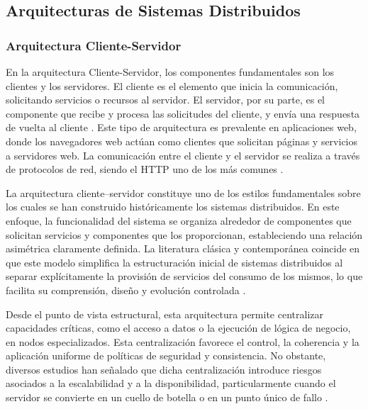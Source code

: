 			\subsection{Arquitecturas de Sistemas Distribuidos}
			\noindent
			
				\subsubsection{Arquitectura Cliente-Servidor}
				\noindent
					En la arquitectura Cliente-Servidor, los componentes fundamentales son los clientes y los servidores. El cliente es el elemento que inicia la comunicación, solicitando servicios o recursos al servidor. El servidor, por su parte, es el componente que recibe y procesa las solicitudes del cliente, y envía una respuesta de vuelta al cliente \cite{Francisco2021}. Este tipo de arquitectura es prevalente en aplicaciones web, donde los navegadores web actúan como clientes que solicitan páginas y servicios a servidores web. La comunicación entre el cliente y el servidor se realiza a través de protocolos de red, siendo el HTTP uno de los más comunes \cite{Colaso2019accuracy,Francisco2021}.
					
					La arquitectura cliente–servidor constituye uno de los estilos fundamentales sobre los cuales se han construido históricamente los sistemas distribuidos. En este enfoque, la funcionalidad del sistema se organiza alrededor de componentes que solicitan servicios y componentes que los proporcionan, estableciendo una relación asimétrica claramente definida. La literatura clásica y contemporánea coincide en que este modelo simplifica la estructuración inicial de sistemas distribuidos al separar explícitamente la provisión de servicios del consumo de los mismos, lo que facilita su comprensión, diseño y evolución controlada \cite{Tanenbaum2023Distributed,Coulouris2011Distributed}.
					
					Desde el punto de vista estructural, esta arquitectura permite centralizar capacidades críticas, como el acceso a datos o la ejecución de lógica de negocio, en nodos especializados. Esta centralización favorece el control, la coherencia y la aplicación uniforme de políticas de seguridad y consistencia. No obstante, diversos estudios han señalado que dicha centralización introduce riesgos asociados a la escalabilidad y a la disponibilidad, particularmente cuando el servidor se convierte en un cuello de botella o en un punto único de fallo \cite{Bass2013Architecture,Stallings2022Network}.
					
